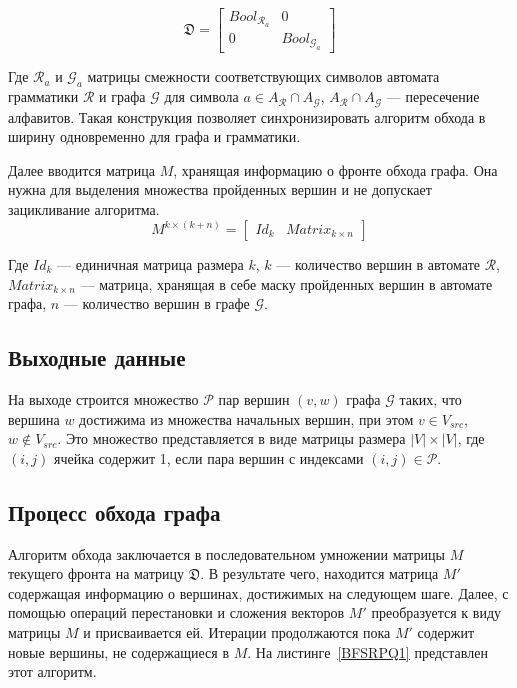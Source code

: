 \begin{equation}
\mathfrak{D} = 
  \left[
    \begin{matrix}
        Bool_{\mathcal{R}_a} & 0\\
        0 & Bool_{\mathcal{G}_a}
    \end{matrix}
  \right]
\end{equation}

Где $\mathcal{R}_{a}$ и $\mathcal{G}_{a}$ матрицы смежности соответствующих символов автомата грамматики $\mathcal{R}$ и графа $\mathcal{G}$ для символа $a \in A_\mathcal{R} \cap A_\mathcal{G}$, $A_\mathcal{R} \cap A_\mathcal{G}$ --- пересечение алфавитов. Такая конструкция позволяет синхронизировать алгоритм обхода в ширину одновременно для графа и грамматики.

Далее вводится матрица $M$, хранящая информацию о фронте обхода графа. Она нужна для выделения множества пройденных вершин и не допускает зацикливание алгоритма.
\begin{equation}
M^{k \times (k + n)} =
  \left[
    \begin{matrix}
        Id_k & Matrix_{k \times n }
    \end{matrix}
  \right]
\end{equation}

Где $Id_k$ --- единичная матрица размера $k$, $k$ --- количество вершин в автомате $\mathcal{R}$, $Matrix_{k \times n }$ --- матрица, хранящая в себе маску пройденных вершин в автомате графа, $n$ --- количество вершин в графе $\mathcal{G}$.

\subsection{Выходные данные}

На выходе строится множество $\mathcal{P}$ пар вершин $(v, w)$ графа $\mathcal{G}$ таких, что вершина $w$ достижима из множества начальных вершин, при этом $v \in V_{src}$, $w \not\in V_{src}$. Это множество представляется в виде матрицы размера $|V|\times|V|$, где $(i,j)$ ячейка содержит 1, если пара вершин с индексами $(i, j) \in \mathcal{P}$.

\subsection{Процесс обхода графа}

Алгоритм обхода заключается в последовательном умножении матрицы $M$ текущего фронта на матрицу $\mathfrak{D}$. В результате чего, находится матрица $M'$ содержащая информацию о вершинах, достижимых на следующем шаге. Далее, с помощью операций перестановки и сложения векторов $M'$ преобразуется к виду матрицы $M$ и присваивается ей. Итерации продолжаются пока $M'$ содержит новые вершины, не содержащиеся в $M$. На листинге~\ref{BFSRPQ1} представлен этот алгоритм.

